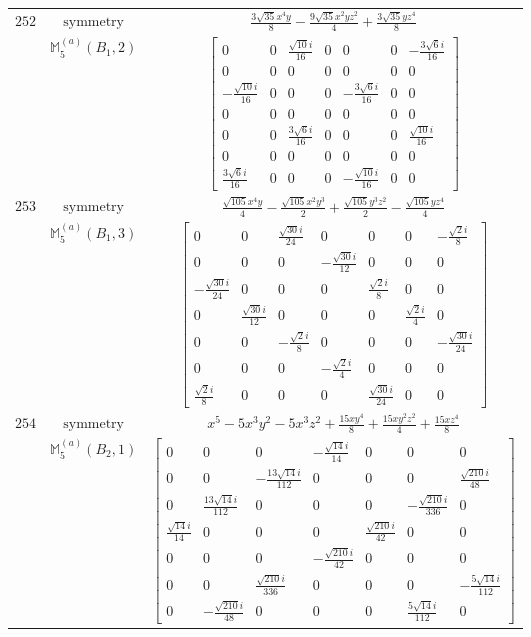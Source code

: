 \documentclass[fleqn,8pt,landscape]{jsarticle}
\begin{document}
\begin{longtable}{ccc}
$ 252 $ & $ \text{symmetry} $ & $ \frac{3 \sqrt{35} x^{4} y}{8} - \frac{9 \sqrt{35} x^{2} y z^{2}}{4} + \frac{3 \sqrt{35} y z^{4}}{8} $ \\
$  $ & $ \mathbb{M}_{5}^{(a)}(B_{1},2) $ & $ \begin{bmatrix} 0 & 0 & \frac{\sqrt{10} i}{16} & 0 & 0 & 0 & - \frac{3 \sqrt{6} i}{16} \\ 0 & 0 & 0 & 0 & 0 & 0 & 0 \\ - \frac{\sqrt{10} i}{16} & 0 & 0 & 0 & - \frac{3 \sqrt{6} i}{16} & 0 & 0 \\ 0 & 0 & 0 & 0 & 0 & 0 & 0 \\ 0 & 0 & \frac{3 \sqrt{6} i}{16} & 0 & 0 & 0 & \frac{\sqrt{10} i}{16} \\ 0 & 0 & 0 & 0 & 0 & 0 & 0 \\ \frac{3 \sqrt{6} i}{16} & 0 & 0 & 0 & - \frac{\sqrt{10} i}{16} & 0 & 0 \end{bmatrix} $ \\ \hline
$ 253 $ & $ \text{symmetry} $ & $ \frac{\sqrt{105} x^{4} y}{4} - \frac{\sqrt{105} x^{2} y^{3}}{2} + \frac{\sqrt{105} y^{3} z^{2}}{2} - \frac{\sqrt{105} y z^{4}}{4} $ \\
$  $ & $ \mathbb{M}_{5}^{(a)}(B_{1},3) $ & $ \begin{bmatrix} 0 & 0 & \frac{\sqrt{30} i}{24} & 0 & 0 & 0 & - \frac{\sqrt{2} i}{8} \\ 0 & 0 & 0 & - \frac{\sqrt{30} i}{12} & 0 & 0 & 0 \\ - \frac{\sqrt{30} i}{24} & 0 & 0 & 0 & \frac{\sqrt{2} i}{8} & 0 & 0 \\ 0 & \frac{\sqrt{30} i}{12} & 0 & 0 & 0 & \frac{\sqrt{2} i}{4} & 0 \\ 0 & 0 & - \frac{\sqrt{2} i}{8} & 0 & 0 & 0 & - \frac{\sqrt{30} i}{24} \\ 0 & 0 & 0 & - \frac{\sqrt{2} i}{4} & 0 & 0 & 0 \\ \frac{\sqrt{2} i}{8} & 0 & 0 & 0 & \frac{\sqrt{30} i}{24} & 0 & 0 \end{bmatrix} $ \\ \hline
$ 254 $ & $ \text{symmetry} $ & $ x^{5} - 5 x^{3} y^{2} - 5 x^{3} z^{2} + \frac{15 x y^{4}}{8} + \frac{15 x y^{2} z^{2}}{4} + \frac{15 x z^{4}}{8} $ \\
$  $ & $ \mathbb{M}_{5}^{(a)}(B_{2},1) $ & $ \begin{bmatrix} 0 & 0 & 0 & - \frac{\sqrt{14} i}{14} & 0 & 0 & 0 \\ 0 & 0 & - \frac{13 \sqrt{14} i}{112} & 0 & 0 & 0 & \frac{\sqrt{210} i}{48} \\ 0 & \frac{13 \sqrt{14} i}{112} & 0 & 0 & 0 & - \frac{\sqrt{210} i}{336} & 0 \\ \frac{\sqrt{14} i}{14} & 0 & 0 & 0 & \frac{\sqrt{210} i}{42} & 0 & 0 \\ 0 & 0 & 0 & - \frac{\sqrt{210} i}{42} & 0 & 0 & 0 \\ 0 & 0 & \frac{\sqrt{210} i}{336} & 0 & 0 & 0 & - \frac{5 \sqrt{14} i}{112} \\ 0 & - \frac{\sqrt{210} i}{48} & 0 & 0 & 0 & \frac{5 \sqrt{14} i}{112} & 0 \end{bmatrix} $ \\ \hline

\end{longtable}
\end{document}
